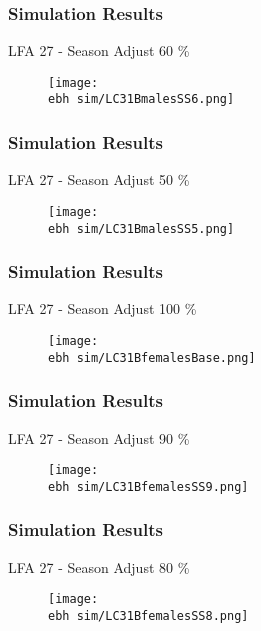\documentclass{beamer}
\newcommand{\ebh}{\string~/bio.data/bio.lobster/figures/LFA2733Framework2018/} %
\begin{document}
\begin{frame}
\frametitle{Simulation Results}
LFA 27 - Season Adjust 60 \%
\begin{figure}
        \begin{center}
            \texttt{[image: \\ebh sim/LC31BmalesSS6.png]}
        \end{center}
    \end{figure}
\end{frame}


\begin{frame}
\frametitle{Simulation Results}
LFA 27 - Season Adjust 50 \%
\begin{figure}
        \begin{center}
            \texttt{[image: \\ebh sim/LC31BmalesSS5.png]}
        \end{center}
    \end{figure}
\end{frame}




\begin{frame}
\frametitle{Simulation Results}
LFA 27 - Season Adjust 100 \%
\begin{figure}
        \begin{center}
            \texttt{[image: \\ebh sim/LC31BfemalesBase.png]}
        \end{center}
    \end{figure}
\end{frame}


\begin{frame}
\frametitle{Simulation Results}
LFA 27 - Season Adjust 90 \%
\begin{figure}
        \begin{center}
            \texttt{[image: \\ebh sim/LC31BfemalesSS9.png]}
        \end{center}
    \end{figure}
\end{frame}


\begin{frame}
\frametitle{Simulation Results}
LFA 27 - Season Adjust 80 \%
\begin{figure}
        \begin{center}
            \texttt{[image: \\ebh sim/LC31BfemalesSS8.png]}
        \end{center}
    \end{figure}
\end{frame}
\end{document}
